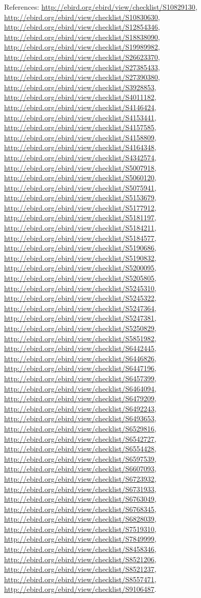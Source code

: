 \documentclass[9pt, article]{memoir}
\begin{document}
\begin{multicols}{2}
References: 
\url{http://ebird.org/ebird/view/checklist/S10829130}, 
\url{http://ebird.org/ebird/view/checklist/S10830630}, 
\url{http://ebird.org/ebird/view/checklist/S12854346}, 
\url{http://ebird.org/ebird/view/checklist/S18838090}, 
\url{http://ebird.org/ebird/view/checklist/S19989982}, 
\url{http://ebird.org/ebird/view/checklist/S26623370}, 
\url{http://ebird.org/ebird/view/checklist/S27385433}, 
\url{http://ebird.org/ebird/view/checklist/S27390380}, 
\url{http://ebird.org/ebird/view/checklist/S3928853}, 
\url{http://ebird.org/ebird/view/checklist/S4011182}, 
\url{http://ebird.org/ebird/view/checklist/S4146424}, 
\url{http://ebird.org/ebird/view/checklist/S4153441}, 
\url{http://ebird.org/ebird/view/checklist/S4157585}, 
\url{http://ebird.org/ebird/view/checklist/S4158809}, 
\url{http://ebird.org/ebird/view/checklist/S4164348}, 
\url{http://ebird.org/ebird/view/checklist/S4342574}, 
\url{http://ebird.org/ebird/view/checklist/S5007918}, 
\url{http://ebird.org/ebird/view/checklist/S5060120}, 
\url{http://ebird.org/ebird/view/checklist/S5075941}, 
\url{http://ebird.org/ebird/view/checklist/S5153679}, 
\url{http://ebird.org/ebird/view/checklist/S5177912}, 
\url{http://ebird.org/ebird/view/checklist/S5181197}, 
\url{http://ebird.org/ebird/view/checklist/S5184211}, 
\url{http://ebird.org/ebird/view/checklist/S5184577}, 
\url{http://ebird.org/ebird/view/checklist/S5190686}, 
\url{http://ebird.org/ebird/view/checklist/S5190832}, 
\url{http://ebird.org/ebird/view/checklist/S5200095}, 
\url{http://ebird.org/ebird/view/checklist/S5205805}, 
\url{http://ebird.org/ebird/view/checklist/S5245310}, 
\url{http://ebird.org/ebird/view/checklist/S5245322}, 
\url{http://ebird.org/ebird/view/checklist/S5247364}, 
\url{http://ebird.org/ebird/view/checklist/S5247381}, 
\url{http://ebird.org/ebird/view/checklist/S5250829}, 
\url{http://ebird.org/ebird/view/checklist/S5851982}, 
\url{http://ebird.org/ebird/view/checklist/S6442445}, 
\url{http://ebird.org/ebird/view/checklist/S6446826}, 
\url{http://ebird.org/ebird/view/checklist/S6447196}, 
\url{http://ebird.org/ebird/view/checklist/S6457399}, 
\url{http://ebird.org/ebird/view/checklist/S6464094}, 
\url{http://ebird.org/ebird/view/checklist/S6479209}, 
\url{http://ebird.org/ebird/view/checklist/S6492243}, 
\url{http://ebird.org/ebird/view/checklist/S6493653}, 
\url{http://ebird.org/ebird/view/checklist/S6529816}, 
\url{http://ebird.org/ebird/view/checklist/S6542727}, 
\url{http://ebird.org/ebird/view/checklist/S6554428}, 
\url{http://ebird.org/ebird/view/checklist/S6597539}, 
\url{http://ebird.org/ebird/view/checklist/S6607093}, 
\url{http://ebird.org/ebird/view/checklist/S6723932}, 
\url{http://ebird.org/ebird/view/checklist/S6731933}, 
\url{http://ebird.org/ebird/view/checklist/S6763049}, 
\url{http://ebird.org/ebird/view/checklist/S6768345}, 
\url{http://ebird.org/ebird/view/checklist/S6828039}, 
\url{http://ebird.org/ebird/view/checklist/S7519310}, 
\url{http://ebird.org/ebird/view/checklist/S7849999}, 
\url{http://ebird.org/ebird/view/checklist/S8458346}, 
\url{http://ebird.org/ebird/view/checklist/S8521206}, 
\url{http://ebird.org/ebird/view/checklist/S8521237}, 
\url{http://ebird.org/ebird/view/checklist/S8557471}, 
\url{http://ebird.org/ebird/view/checklist/S9106487}.


\end{multicols}
\end{document}
